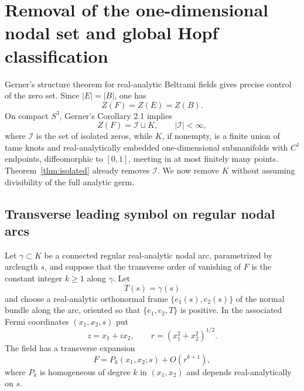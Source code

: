 \documentclass[aps,prd,reprint,nofootinbib,superscriptaddress]{revtex4-2}
\theoremstyle{definition}
\theoremstyle{remark}
\newcommand{\cI}{\mathcal{I}}
\begin{document}
\section{Removal of the one-dimensional nodal set and global Hopf classification}
\label{sec:globalremoval}

Gerner's structure theorem for real-analytic Beltrami fields \cite{Gerner2021} gives precise control of the zero set. Since $|E|=|B|$, one has
\begin{equation}
Z(F)=Z(E)=Z(B).
\label{eq:zerosame}
\end{equation}
On compact $S^3$, Gerner's Corollary 2.1 implies
\begin{equation}
Z(F)=\cI\sqcup K,
\qquad |\cI|<\infty,
\label{eq:Gernerdecomp}
\end{equation}
where $\cI$ is the set of isolated zeros, while $K$, if nonempty, is a finite union of tame knots and real-analytically embedded one-dimensional submanifolds with $C^1$ endpoints, diffeomorphic to $[0,1]$, meeting in at most finitely many points. Theorem~\ref{thm:isolated} already removes $\cI$. We now remove $K$ without assuming divisibility of the full analytic germ.

\subsection{Transverse leading symbol on regular nodal arcs}
\label{subsec:transverse}

Let $\gamma\subset K$ be a connected regular real-analytic nodal arc, parametrized by arclength $s$, and suppose that the transverse order of vanishing of $F$ is the constant integer $k\ge1$ along $\gamma$. Let
\[
T(s)=\dot\gamma(s)
\]
and choose a real-analytic orthonormal frame $\{e_1(s),e_2(s)\}$ of the normal bundle along the arc, oriented so that $\{e_1,e_2,T\}$ is positive. In the associated Fermi coordinates $(x_1,x_2,s)$ put
\[
z=x_1+ix_2,
\qquad r=(x_1^2+x_2^2)^{1/2}.
\]
The field has a transverse expansion
\begin{equation}
F=P_k(x_1,x_2;s)+O(r^{k+1}),
\label{eq:transverseexpansion}
\end{equation}
where $P_k$ is homogeneous of degree $k$ in $(x_1,x_2)$ and depends real-analytically on $s$.
\end{document}
